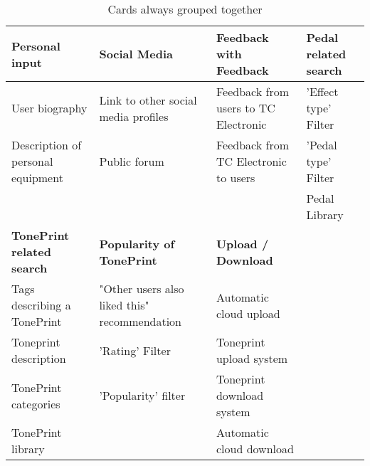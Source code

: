 \begin{table}[h]
\begin{tabularx}{\textwidth}{|R|R|R|R|}
\hline
\textbf{Personal input} & \textbf{Social Media} & \textbf{Feedback with Feedback} & \textbf{Pedal related search}\\ \hline
User biography & Link to other social media profiles & Feedback from users to TC Electronic & 'Effect type' Filter \\
Description of personal equipment & Public forum & Feedback from TC Electronic to users & 'Pedal type' Filter \\ 
&&& Pedal Library \\ \hline
\textbf{TonePrint related search} & \textbf{Popularity of TonePrint} & \textbf{Upload / Download} & \\ \hline
Tags describing a TonePrint & "Other users also liked this" recommendation & Automatic cloud upload & \\
Toneprint description & 'Rating' Filter & Toneprint upload system & \\ 
TonePrint categories & 'Popularity' filter & Toneprint download system & \\
TonePrint library & & Automatic cloud download & \\ \hline
\end{tabularx}
\caption{Cards always grouped together}
\label{FrequentGroups}
\end{table}





